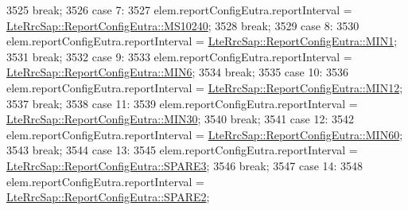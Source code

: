 \begin{DoxyCode}
3525                   \textcolor{keywordflow}{break};
3526                 \textcolor{keywordflow}{case} 7:
3527                   elem.reportConfigEutra.reportInterval = 
      \hyperlink{structns3_1_1LteRrcSap_1_1ReportConfigEutra_aa04b2781a844eb212d59762829e41d31a163db72202989eb3e834c39ddf2e8ef2}{LteRrcSap::ReportConfigEutra::MS10240};
3528                   \textcolor{keywordflow}{break};
3529                 \textcolor{keywordflow}{case} 8:
3530                   elem.reportConfigEutra.reportInterval = 
      \hyperlink{structns3_1_1LteRrcSap_1_1ReportConfigEutra_aa04b2781a844eb212d59762829e41d31a15a28a08b76fe4cc05234cfedc050e7a}{LteRrcSap::ReportConfigEutra::MIN1};
3531                   \textcolor{keywordflow}{break};
3532                 \textcolor{keywordflow}{case} 9:
3533                   elem.reportConfigEutra.reportInterval = 
      \hyperlink{structns3_1_1LteRrcSap_1_1ReportConfigEutra_aa04b2781a844eb212d59762829e41d31a0ecbd0419470febb3f933e4d682c6693}{LteRrcSap::ReportConfigEutra::MIN6};
3534                   \textcolor{keywordflow}{break};
3535                 \textcolor{keywordflow}{case} 10:
3536                   elem.reportConfigEutra.reportInterval = 
      \hyperlink{structns3_1_1LteRrcSap_1_1ReportConfigEutra_aa04b2781a844eb212d59762829e41d31ab54b88187e9889c795d917fde8146bc0}{LteRrcSap::ReportConfigEutra::MIN12};
3537                   \textcolor{keywordflow}{break};
3538                 \textcolor{keywordflow}{case} 11:
3539                   elem.reportConfigEutra.reportInterval = 
      \hyperlink{structns3_1_1LteRrcSap_1_1ReportConfigEutra_aa04b2781a844eb212d59762829e41d31a24ac010a5bd15a879a72e4ae74af1888}{LteRrcSap::ReportConfigEutra::MIN30};
3540                   \textcolor{keywordflow}{break};
3541                 \textcolor{keywordflow}{case} 12:
3542                   elem.reportConfigEutra.reportInterval = 
      \hyperlink{structns3_1_1LteRrcSap_1_1ReportConfigEutra_aa04b2781a844eb212d59762829e41d31a5a44a7fcc783d70c87af931c0760a46d}{LteRrcSap::ReportConfigEutra::MIN60};
3543                   \textcolor{keywordflow}{break};
3544                 \textcolor{keywordflow}{case} 13:
3545                   elem.reportConfigEutra.reportInterval = 
      \hyperlink{structns3_1_1LteRrcSap_1_1ReportConfigEutra_aa04b2781a844eb212d59762829e41d31ae31c4428b54bc1829be9a7643f30c6fe}{LteRrcSap::ReportConfigEutra::SPARE3};
3546                   \textcolor{keywordflow}{break};
3547                 \textcolor{keywordflow}{case} 14:
3548                   elem.reportConfigEutra.reportInterval = 
      \hyperlink{structns3_1_1LteRrcSap_1_1ReportConfigEutra_aa04b2781a844eb212d59762829e41d31a0df93d4b3926e9a7bdffbc82239063d1}{LteRrcSap::ReportConfigEutra::SPARE2};

\end{DoxyCode}
